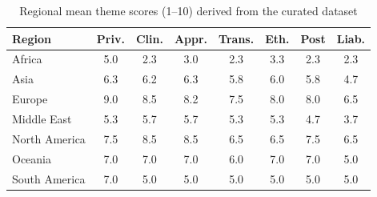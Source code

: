 \begin{table}[htbp]
\centering
\caption{Regional mean theme scores (1--10) derived from the curated dataset}
\label{tab:regional-means}
\begin{tabular}{@{}lccccccc@{}}
\toprule
\textbf{Region} & \textbf{Priv.} & \textbf{Clin.} & \textbf{Appr.} & \textbf{Trans.} & \textbf{Eth.} & \textbf{Post} & \textbf{Liab.} \\
\midrule
Africa & 5.0 & 2.3 & 3.0 & 2.3 & 3.3 & 2.3 & 2.3 \\
Asia & 6.3 & 6.2 & 6.3 & 5.8 & 6.0 & 5.8 & 4.7 \\
Europe & 9.0 & 8.5 & 8.2 & 7.5 & 8.0 & 8.0 & 6.5 \\
Middle East & 5.3 & 5.7 & 5.7 & 5.3 & 5.3 & 4.7 & 3.7 \\
North America & 7.5 & 8.5 & 8.5 & 6.5 & 6.5 & 7.5 & 6.5 \\
Oceania & 7.0 & 7.0 & 7.0 & 6.0 & 7.0 & 7.0 & 5.0 \\
South America & 7.0 & 5.0 & 5.0 & 5.0 & 5.0 & 5.0 & 5.0 \\
\bottomrule
\end{tabular}
\end{table}
